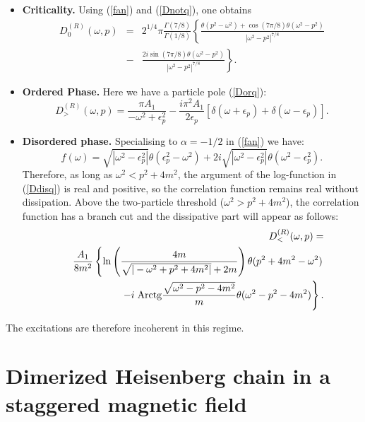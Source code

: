 \begin{itemize}
\item{\bf Criticality.} Using (\ref{fan})
and (\ref{Dnotq}), one obtains
\begin{eqnarray}
D_0^{(R)}(\omega,p)&=& 2^{1/4}\pi
\frac{\Gamma(7/8)}{\Gamma(1/8)}
\left\{
\frac{\theta(p^2-\omega^2)+\cos(7\pi/8) \theta(\omega^2-p^2)}{|\omega^2-p^2|^{7/8}}
\right. \nonumber \\ &-&
\left.\frac{2i\sin(7\pi/8)\theta(\omega^2- p^2)}{|\omega^2-p^2|^{7/8}} \right\}.
\label{Dnotfin}
\end{eqnarray}
\item{\bf Ordered Phase.} Here
we have a particle pole (\ref{Dorq}):
\begin{equation}
D_>^{(R)}(\omega,p)=
\frac{\pi A_1}{-\omega^2+\epsilon_p^2}-
\frac{i\pi^2 A_1}{2\epsilon_p}
\left[\delta(\omega+\epsilon_p)+\delta(\omega-\epsilon_p) \right].
\label{Dorfin}
\end{equation}
\item{\bf Disordered phase.} Specialising to $\alpha=-1/2$
in (\ref{fan}) we have:
\begin{equation}
f(\omega)=
\sqrt{|\omega^2-\epsilon_p^2|}\theta(\epsilon_p^2-\omega^2)
+2i
\sqrt{|\omega^2-\epsilon_p^2|}
\theta(\omega^2-\epsilon_p^2).
\label{fanbis}
\end{equation}
Therefore, as long as $\omega^2<p^2+4m^2$,
the argument of the log-function in (\ref{Ddisq})
is real and positive, so the correlation function
remains real without dissipation.
Above the two-particle threshold
($\omega^2>p^2+4m^2$),
the correlation function has a branch cut and the
dissipative part will appear as follows:
\begin{eqnarray}
&~&D_<^{(R)}(\omega,p)=\nonumber\\
&~&\frac{A_1}{8m^2}\left\{
\ln\left(\frac{4m}{ \sqrt{|-\omega^2+p^2+4m^2|}+2m}\right)
\theta(p^2+4m^2-\omega^2)\right.\nonumber\\
&~&-i\left.{\rm
Arctg}\frac{\sqrt{\omega^2-p^2-4m^2}}{m}
\theta(\omega^2-p^2-4m^2)\right\}.
\label{Ddisfin}
\end{eqnarray}
\end{itemize}
The excitations are therefore incoherent in this regime.

\section{Dimerized Heisenberg chain in  a staggered magnetic field}

